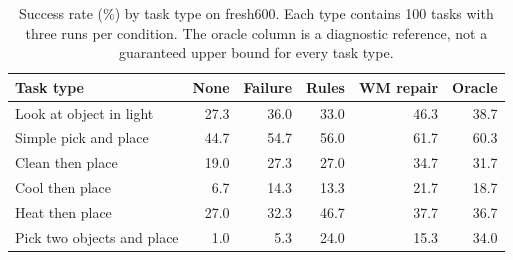 \begin{table}[tbp]
\caption{Success rate (\%) by task type on fresh600. Each type contains 100 tasks with three runs per condition. The oracle column is a diagnostic reference, not a guaranteed upper bound for every task type.}
\label{tab:tasks}\centering
\begin{tabular}{lrrrrr}\toprule
Task type & None & Failure & Rules & WM repair & Oracle\\\midrule
Look at object in light & 27.3 & 36.0 & 33.0 & 46.3 & 38.7\\
Simple pick and place & 44.7 & 54.7 & 56.0 & 61.7 & 60.3\\
Clean then place & 19.0 & 27.3 & 27.0 & 34.7 & 31.7\\
Cool then place & 6.7 & 14.3 & 13.3 & 21.7 & 18.7\\
Heat then place & 27.0 & 32.3 & 46.7 & 37.7 & 36.7\\
Pick two objects and place & 1.0 & 5.3 & 24.0 & 15.3 & 34.0\\\bottomrule
\end{tabular}
\end{table}
